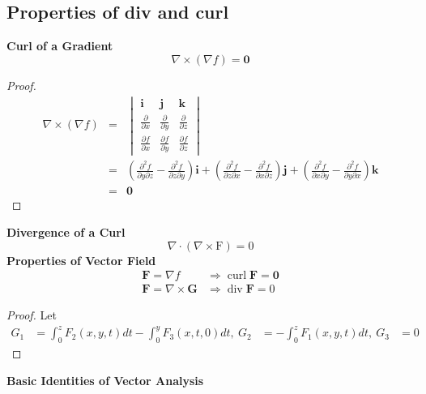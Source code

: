 \documentclass[11pt]{article}
\begin{document}
\subsection{Properties of div and curl}
\textbf{Curl of a Gradient}
\[\nabla \times (\nabla f) = \mathbf{0}\]
\begin{proof}
    \begin{eqnarray*}
      \nabla \times (\nabla f) &=&  
      \begin{vmatrix} \mathbf{i} & \mathbf{j} & \mathbf{k} \\
        \frac{\partial}{\partial{x}} & \frac{\partial}{\partial{y}} & \frac{\partial}{\partial{z}}\\
        \frac{\partial f}{\partial{x}} & \frac{\partial f}{\partial{y}} & \frac{\partial f}{\partial{z}} \end{vmatrix}\\
        &=& \left(\frac{\partial^{2} f}{\partial y \partial z}-\frac{\partial^{2} f}{\partial z \partial y}\right) \mathbf{i}+\left(\frac{\partial^{2} f}{\partial z \partial x}-\frac{\partial^{2} f}{\partial x \partial z}\right) \mathbf{j}+\left(\frac{\partial^{2} f}{\partial x \partial y}-\frac{\partial^{2} f}{\partial y \partial x}\right) \mathbf{k}\\
        &=& \mathbf{0}
    \end{eqnarray*}
\end{proof}
\textbf{Divergence of a Curl}
\[\nabla \cdot(\nabla \times \mathrm{F})=0\]
\textbf{Properties of Vector Field}
\[\begin{aligned}
    \mathbf{F}=\nabla f & \Rightarrow  \operatorname{curl} \mathbf{F}=\mathbf{0} \\
    \mathbf{F}=\nabla \times \mathbf{G} & \Rightarrow \operatorname{div} \mathbf{F}=0
\end{aligned}\]
\begin{proof}
    Let
    \[\begin{aligned}
        G_{1}&=\int_{0}^{z} F_{2}(x, y, t) d t-\int_{0}^{y} F_{3}(x, t, 0) d t ,~
        G_{2}&=-\int_{0}^{z} F_{1}(x, y, t) d t,~
        G_3 &= 0
    \end{aligned}\]
\end{proof}
\newpage
\textbf{Basic Identities of Vector Analysis}
\end{document}
